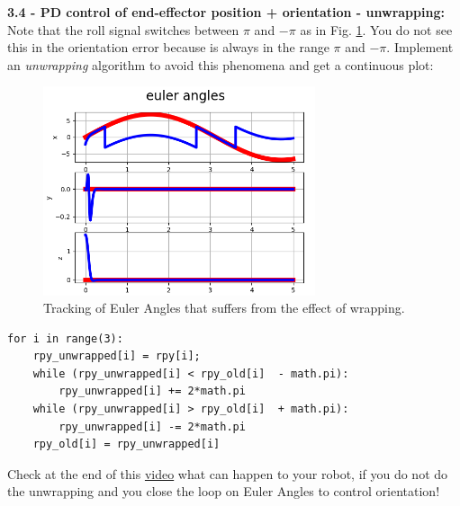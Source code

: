 \documentclass[11pt]{article}
\begin{document}
\textbf{3.4 - PD control of end-effector position + orientation - unwrapping:}
Note that the roll signal switches between $\pi$ and $-\pi$ as in Fig. \ref{fig:rpy}. You do not see this in the orientation error because is always in the range $\pi$ and $-\pi$. Implement an \textit{unwrapping} algorithm to avoid this phenomena and get a continuous plot:

\begin{figure}[H]
	\centering
	\includegraphics[width=8cm]{pics/euler_angles_tracking.png}
	\caption{Tracking of Euler Angles that suffers from the effect of wrapping.}
	\label{fig:rpy}
\end{figure}

\begin{verbatim}
for i in range(3):
    rpy_unwrapped[i] = rpy[i];
    while (rpy_unwrapped[i] < rpy_old[i]  - math.pi):
        rpy_unwrapped[i] += 2*math.pi
    while (rpy_unwrapped[i] > rpy_old[i]  + math.pi):  
        rpy_unwrapped[i] -= 2*math.pi
    rpy_old[i] = rpy_unwrapped[i] 	
\end{verbatim}

Check at the end of this \href{https://youtu.be/sax0QzG8qAw }{video} what can happen to your robot, if you do not do the unwrapping and you close the loop on Euler Angles to control orientation! \\
\end{document}
